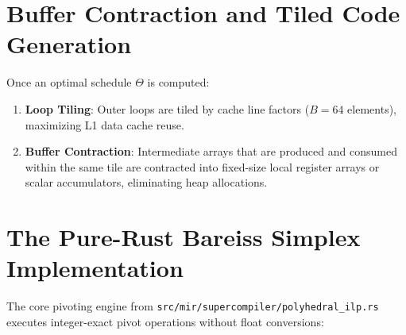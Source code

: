 \section{Buffer Contraction and Tiled Code Generation}
\label{sec:polyhedral:tiling}

Once an optimal schedule $\Theta$ is computed:
\begin{enumerate}
    \item \textbf{Loop Tiling}: Outer loops are tiled by cache line factors ($B = 64$ elements), maximizing L1 data cache reuse.
    \item \textbf{Buffer Contraction}: Intermediate arrays that are produced and consumed within the same tile are contracted into fixed-size local register arrays or scalar accumulators, eliminating heap allocations.
\end{enumerate}

\section{The Pure-Rust Bareiss Simplex Implementation}
\label{sec:polyhedral:code_walk}

The core pivoting engine from \texttt{src/mir/supercompiler/polyhedral\_ilp.rs} executes integer-exact pivot operations without float conversions:

